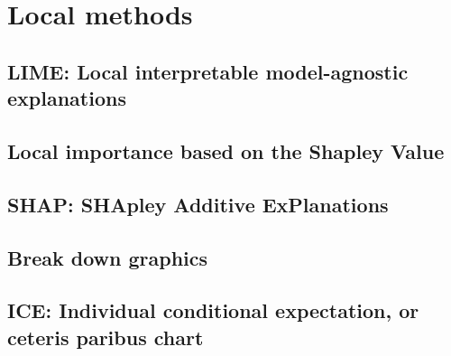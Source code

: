\section{Local methods}

\subsection{LIME: Local interpretable model-agnostic explanations}
\subsection{Local importance based on the Shapley Value}
\subsection{SHAP: SHApley Additive ExPlanations}
\subsection{Break down graphics}
\subsection{ICE: Individual conditional expectation, or ceteris paribus chart}
